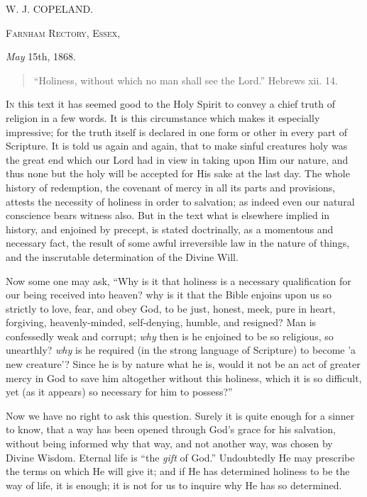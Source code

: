 W. J. COPELAND.


F\textsc{arnham} R\textsc{ectory}, E\textsc{ssex},

\emph{May} 15th, 1868.


\begin{quote}

``Holiness, without which no man shall see the
Lord.'' Hebrews xii. 14.

\end{quote}

I\textsc{n} this text it has seemed good to the Holy Spirit to
convey a chief truth of religion in a few words. It is
this circumstance which makes it especially impressive;
for the truth itself is declared in one form or other in
every part of Scripture. It is told us again and again,
that to make sinful creatures holy was the great end
which our Lord had in view in taking upon Him our nature,
and thus none but the holy will be accepted for His sake
at the last day. The whole history of redemption, the
covenant of mercy in all its parts and provisions,
attests the necessity of holiness in order to salvation;
as indeed even our natural conscience bears witness also.
But in the text what is elsewhere implied in history, and
enjoined by precept, is stated doctrinally, as a
momentous and necessary fact, the result of some awful
irreversible law in the nature of things, and the
inscrutable determination of the Divine Will.

Now some one may ask, ``Why is it that holiness is a necessary qualification for our being received into
heaven? why is it that the Bible enjoins upon us so
strictly to love, fear, and obey God, to be just, honest,
meek, pure in heart, forgiving, heavenly-minded,
self-denying, humble, and resigned? Man is confessedly
weak and corrupt; \emph{why} then is he enjoined to be
so religious, so unearthly? \emph{why} is he required
(in the strong language of Scripture) to become 'a new
creature'? Since he is by nature what he is, would it not
be an act of greater mercy in God to save him altogether
without this holiness, which it is so difficult, yet (as
it appears) so necessary for him to possess?''

Now we have no right to ask this question. Surely it
is quite enough for a sinner to know, that a way has been
opened through God's grace for his salvation, without
being informed why that way, and not another way, was
chosen by Divine Wisdom. Eternal life is ``the \emph{gift}
of God.'' Undoubtedly He may prescribe the terms on
which He will give it; and if He has determined holiness
to be the way of life, it is enough; it is not for us to
inquire why He has so determined.

